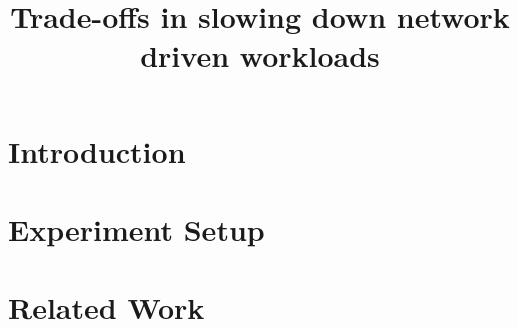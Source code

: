 \documentclass[sigplan,10pt]{acmart}
\begin{document}
\title{Trade-offs in slowing down network driven workloads}


\maketitle

\section{Introduction}

\section{Experiment Setup}


\section{Related Work}




\end{document}
